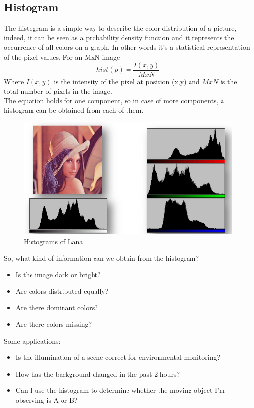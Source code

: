 \subsection{Histogram}
The histogram is a simple way to describe the color distribution of a picture, indeed, it can be seen as a probability density function and it represents the occurrence of all colors on a graph.
In other words it’s a statistical representation of the pixel values. For an MxN image
\[
    hist(p) = \frac{I(x,y)}{MxN}
\]
Where $I(x,y)$ is the intensity of the pixel at position (x,y) and $MxN$ is the total number of pixels in the image.\\
The equation holds for one component, so in case of more components, a histogram can be obtained from each of them.
\begin{figure}[h]
    \centering
    \includegraphics[scale=0.5]{Figures/Histogram.png}
    \caption{Histograms of Lana}
    \label{fig:enter-label}
\end{figure}
So, what kind of information can we obtain from the histogram?
    \begin{itemize}
        \item Is the image dark or bright?
        \item Are colors distributed equally?
        \item Are there dominant colors?
        \item Are there colors missing?
    \end{itemize}
    
    Some applications:
    \begin{itemize}
        \item Is the illumination of a scene correct for environmental monitoring?
        \item How has the background changed in the past 2 hours?
        \item Can I use the histogram to determine whether the moving object I’m observing is A or B?
    \end{itemize} 
    
